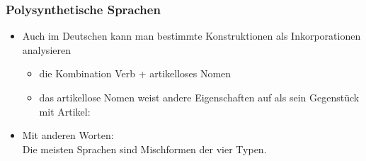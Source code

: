 \begin{frame}
\frametitle{Polysynthetische Sprachen}

\begin{itemize}
	\item Auch im Deutschen kann man bestimmte Konstruktionen als Inkorporationen analysieren
	
	\begin{itemize}
		\item die Kombination Verb + artikelloses Nomen
		\item das artikellose Nomen weist andere Eigenschaften auf als sein Gegenstück mit Artikel:
		
		\z
			 
		\z
			 
		\z
			 
	\end{itemize}
	\item Mit anderen Worten: \\
		Die meisten Sprachen sind Mischformen der vier Typen.
\end{itemize}


\end{frame}

